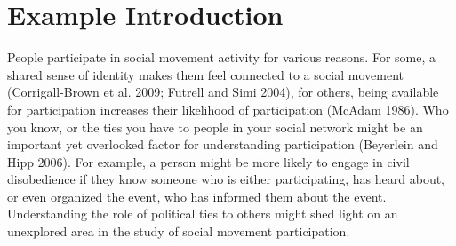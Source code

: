 \documentclass[12pt]{article}
\begin{document}
\newpage
\section*{\center Example Introduction}
People participate in social movement activity for various reasons. For some, a shared sense of identity makes them feel connected to a social movement (Corrigall-Brown et al. 2009; Futrell and Simi 2004), for others, being available for participation increases their likelihood of participation (McAdam 1986). Who you know, or the ties you have to people in your social network might be an important yet overlooked factor for understanding participation (Beyerlein and Hipp 2006). For example, a person might be more likely to engage in civil disobedience if they know someone who is either participating, has heard about, or even organized the event, who has informed them about the event. Understanding the role of political ties to others might shed light on an unexplored area in the study of social movement participation.
\end{document}
